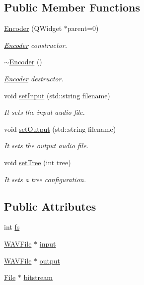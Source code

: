 \subsection*{Public Member Functions}
\begin{DoxyCompactItemize}
\item 
\mbox{\label{class_encoder_a0b084c3a7e670faafd9d651d6913d105}} 
\hyperlink{class_encoder_a0b084c3a7e670faafd9d651d6913d105}{Encoder} (Q\+Widget $\ast$parent=0)
\begin{DoxyCompactList}\small\item\em \hyperlink{class_encoder}{Encoder} constructor. \end{DoxyCompactList}\item 
\mbox{\label{class_encoder_a87cc8067c98c0ab2134dee3822e3b250}} 
\hyperlink{class_encoder_a87cc8067c98c0ab2134dee3822e3b250}{$\sim$\+Encoder} ()
\begin{DoxyCompactList}\small\item\em \hyperlink{class_encoder}{Encoder} destructor. \end{DoxyCompactList}\item 
void \hyperlink{class_encoder_af5623d0bd5fc7b1b2be27375d2994eb1}{set\+Input} (std\+::string filename)
\begin{DoxyCompactList}\small\item\em It sets the input audio file. \end{DoxyCompactList}\item 
void \hyperlink{class_encoder_a81e43409dc83e9118472a81ba65e6779}{set\+Output} (std\+::string filename)
\begin{DoxyCompactList}\small\item\em It sets the output audio file. \end{DoxyCompactList}\item 
void \hyperlink{class_encoder_adc879a1000d99660b36d7369e00f4f06}{set\+Tree} (int tree)
\begin{DoxyCompactList}\small\item\em It sets a tree configuration. \end{DoxyCompactList}\end{DoxyCompactItemize}
\subsection*{Public Attributes}
\begin{DoxyCompactItemize}
\item 
int \hyperlink{class_encoder_aa0549b597ab8fda7191f2e659a56044b}{fs}
\item 
\hyperlink{class_w_a_v_file}{W\+A\+V\+File} $\ast$ \hyperlink{class_encoder_aa851a11113fd12d5cfa04a4a72013157}{input}
\item 
\hyperlink{class_w_a_v_file}{W\+A\+V\+File} $\ast$ \hyperlink{class_encoder_ac4d4774d75750c1fdddd3740b7f30985}{output}
\item 
\hyperlink{class_file}{File} $\ast$ \hyperlink{class_encoder_a8cd18343fe80007dba58b4d716227544}{bitstream}
\end{DoxyCompactItemize}


